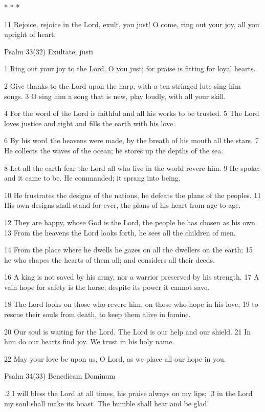 * * *

11 Rejoice, rejoice in the Lord,
exult, you just!
O come, ring out your joy,
all you upright of heart.


Psalm 33(32) Exultate, justi

1 Ring out your joy to the Lord, O you just;
for praise is fitting for loyal hearts.

2 Give thanks to the Lord upon the harp,
with a ten-stringed lute sing him songs.
3 O sing him a song that is new,
play loudly, with all your skill.

4 For the word of the Lord is faithful
and all his works to be trusted.
5 The Lord loves justice and right
and fills the earth with his love.

6 By his word the heavens were made,
by the breath of his mouth all the stars.
7 He collects the waves of the ocean;
he stores up the depths of the sea.

8 Let all the earth fear the Lord
all who live in the world revere him.
9 He spoke; and it came to be.
He commanded; it sprang into being.

10 He frustrates the designs of the nations,
he defeats the plans of the peoples.
11 His own designs shall stand for ever,
the plans of his heart from age to age.

12 They are happy, whose God is the Lord,
the people he has chosen as his own.
13 From the heavens the Lord looks forth,
he sees all the children of men.

14 From the place where he dwells he gazes
on all the dwellers on the earth;
15 he who shapes the hearts of them all;
and considers all their deeds.

16 A king is not saved by his army,
nor a warrior preserved by his strength.
17 A vain hope for safety is the horse;
despite its power it cannot save.

18 The Lord looks on those who revere him,
on those who hope in his love,
19 to rescue their souls from death,
to keep them alive in famine.

20 Our soul is waiting for the Lord.
The Lord is our help and our shield.
21 In him do our hearts find joy.
We trust in his holy name.

22 May your love be upon us, O Lord,
as we place all our hope in you.


Psalm 34(33) Benedicam Dominum

.2 I will bless the Lord at all times,
his praise always on my lips;
.3 in the Lord my soul shall make its boast.
The humble shall hear and be glad.

